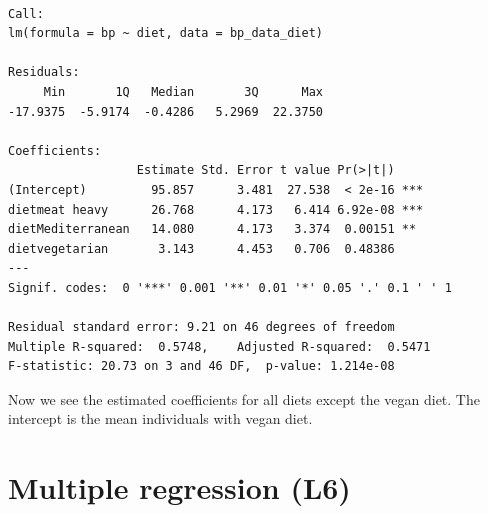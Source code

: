 \documentclass[
  letterpaper,
  8pt,
  a4paper]{book}
\begin{document}
\begin{verbatim}

Call:
lm(formula = bp ~ diet, data = bp_data_diet)

Residuals:
     Min       1Q   Median       3Q      Max 
-17.9375  -5.9174  -0.4286   5.2969  22.3750 

Coefficients:
                  Estimate Std. Error t value Pr(>|t|)    
(Intercept)         95.857      3.481  27.538  < 2e-16 ***
dietmeat heavy      26.768      4.173   6.414 6.92e-08 ***
dietMediterranean   14.080      4.173   3.374  0.00151 ** 
dietvegetarian       3.143      4.453   0.706  0.48386    
---
Signif. codes:  0 '***' 0.001 '**' 0.01 '*' 0.05 '.' 0.1 ' ' 1

Residual standard error: 9.21 on 46 degrees of freedom
Multiple R-squared:  0.5748,    Adjusted R-squared:  0.5471 
F-statistic: 20.73 on 3 and 46 DF,  p-value: 1.214e-08
\end{verbatim}

Now we see the estimated coefficients for all diets except the vegan
diet. The intercept is the mean individuals with vegan diet.


\chapter*{Multiple regression (L6)}\label{multiple-regression-l6}

\end{document}
